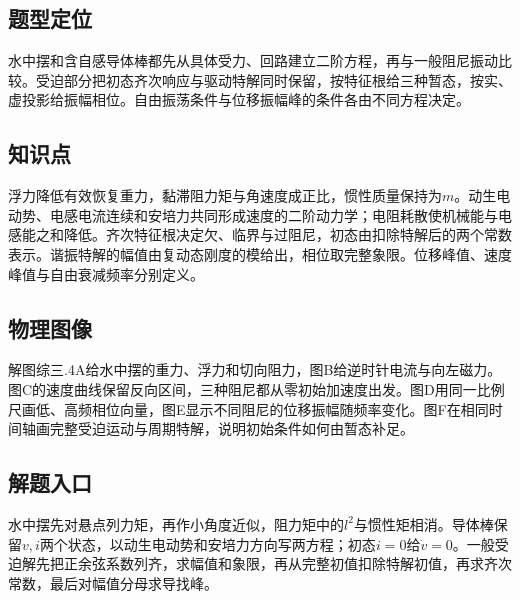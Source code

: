 \documentclass[UTF8,fontset=fandol,a4paper,11pt]{ctexart}
\begin{document}


\subsection*{题型定位}

水中摆和含自感导体棒都先从具体受力、回路建立二阶方程，再与一般阻尼振动比较。受迫部分把初态齐次响应与驱动特解同时保留，按特征根给三种暂态，按实、虚投影给振幅相位。自由振荡条件与位移振幅峰的条件各由不同方程决定。



\subsection*{知识点}

浮力降低有效恢复重力，黏滞阻力矩与角速度成正比，惯性质量保持为$m$。动生电动势、电感电流连续和安培力共同形成速度的二阶动力学；电阻耗散使机械能与电感能之和降低。齐次特征根决定欠、临界与过阻尼，初态由扣除特解后的两个常数表示。谐振特解的幅值由复动态刚度的模给出，相位取完整象限。位移峰值、速度峰值与自由衰减频率分别定义。



\subsection*{物理图像}

解图综三.4A给水中摆的重力、浮力和切向阻力，图B给逆时针电流与向左磁力。图C的速度曲线保留反向区间，三种阻尼都从零初始加速度出发。图D用同一比例尺画低、高频相位向量，图E显示不同阻尼的位移振幅随频率变化。图F在相同时间轴画完整受迫运动与周期特解，说明初始条件如何由暂态补足。



\subsection*{解题入口}

水中摆先对悬点列力矩，再作小角度近似，阻力矩中的$l^2$与惯性矩相消。导体棒保留$v,i$两个状态，以动生电动势和安培力方向写两方程；初态$i=0$给$\dot v=0$。一般受迫解先把正余弦系数列齐，求幅值和象限，再从完整初值扣除特解初值，再求齐次常数，最后对幅值分母求导找峰。
\end{document}
